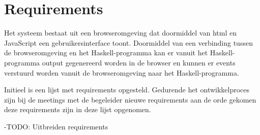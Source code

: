\section{Requirements} \label{sec:requirements}


Het systeem bestaat uit een browseromgeving dat doormiddel van html en JavaScript een gebruikersinterface toont. Doormiddel van een verbinding tussen de browseromgeving en het Haskell-programma kan er vanuit het Haskell-programma output gegenereerd worden in de browser en kunnen er events verstuurd worden vanuit de browseromgeving naar het Haskell-programma.

Initieel is een lijst met requirements opgesteld. Gedurende het ontwikkelproces zijn bij de meetings met de begeleider nieuwe requirements aan de orde gekomen deze requirements zijn in deze lijst opgenomen.

-TODO: Uitbreiden requirements

